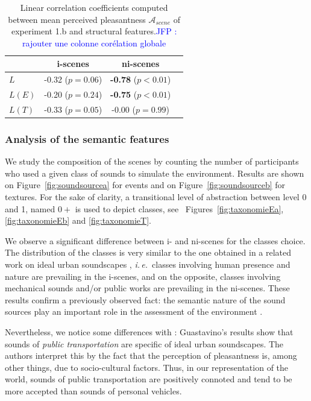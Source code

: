 \documentclass[preprint,12pt]{elsarticle}
\newcommand{\jfp}[1]{\textcolor{blue}{JFP : #1}}
\newcommand{\ie}{\emph{i.\,e.}}
\begin{document}
\begin{table}[t]
\centering
\begin{tabular}{l c c c}
               & i-scenes                   & ni-scenes    \\
\hline
$L$            & -0.32 ($p=0.06$)           & \textbf{-0.78} ($p<0.01$)\\
$L(E)$         & -0.20 ($p=0.24$)           & \textbf{-0.75} ($p<0.01$)\\
$L(T)$         & -0.33 ($p=0.05$)           &  -0.00 ($p=0.99$) \\
\hline
\end{tabular}
\vspace{0.5mm}
\caption{Linear correlation coefficients computed between mean perceived pleasantness $\mathcal{A}_{scene}$ of experiment 1.b and structural features.\jfp{rajouter une colonne corélation globale}}
\label{tab:corrStructA}
\end{table}

\subsubsection*{Analysis of the semantic features}

We study the composition of the scenes by counting the number of participants who used a given class of sounds to simulate the environment. Results are shown on Figure~\ref{fig:soundsourcea} for events and on Figure~\ref{fig:soundsourceb} for textures. For the sake of clarity, a transitional level of abstraction between level 0 and 1, named $0+$ is used to depict classes, see ~Figures~\ref{fig:taxonomieEa}, \ref{fig:taxonomieEb} and \ref{fig:taxonomieT}.

We observe a significant difference between i- and ni-scenes for the classes choice. The distribution of the classes is very similar to the one obtained in a related work on ideal urban soundscapes \cite{guastavino2006ideal}, \ie~classes involving human presence and nature are prevailing in the i-scenes, and on the opposite, classes involving mechanical sounds and/or public works are prevailing in the ni-scenes. These results confirm a previously observed fact: the semantic nature of the sound sources play an important role in the assessment of the environment \cite{raimbault2005urban,dubois2006cognitive}.

Nevertheless, we notice some differences with \cite{guastavino2006ideal}: Guastavino’s results show that sounds of \emph{public transportation} are specific of ideal urban soundscapes. The authors interpret this by the fact that the perception of pleasantness is, among other things, due to socio-cultural factors. Thus, in our representation of the world, sounds of public transportation are positively connoted and tend to be more accepted than sounds of personal vehicles.
\end{document}
